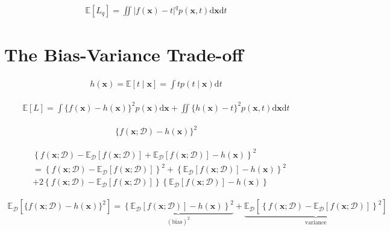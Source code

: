 \documentclass{article}
\begin{document}
\begin{align*}
\mathbb{E}\left[ L_q \right] = \iint |f(\mathbf{x}) - t|^{q} p(\mathbf{x}, t) \mathrm{d} \mathbf{x} \mathrm{d} t
\tag{4.40}
\end{align*}

\section{The Bias-Variance Trade-off}

\begin{align*}
h(\mathbf{x}) = \mathbb{E}[t \mid \mathbf{x}] = \int t p(t \mid \mathbf{x}) \mathrm{d} t
\tag{4.41}
\end{align*}

\begin{align*}
\mathbb{E}[L] = \int \{f(\mathbf{x}) - h(\mathbf{x})\}^{2} p(\mathbf{x}) \mathrm{d} \mathbf{x} + \iint \{h(\mathbf{x}) - t\}^{2} p(\mathbf{x}, t) \mathrm{d} \mathbf{x} \mathrm{d} t
\tag{4.42}
\end{align*}

\begin{align*}
\{f(\mathbf{x} ; \mathcal{D}) - h(\mathbf{x})\}^{2}
\tag{4.43}
\end{align*}

\begin{align*}
& \left\{ f(\mathbf{x} ; \mathcal{D}) - \mathbb{E}_{\mathcal{D}}[f(\mathbf{x} ; \mathcal{D})] + \mathbb{E}_{\mathcal{D}}[f(\mathbf{x} ; \mathcal{D})] - h(\mathbf{x}) \right\}^{2} \\
& = \left\{ f(\mathbf{x} ; \mathcal{D}) - \mathbb{E}_{\mathcal{D}}[f(\mathbf{x} ; \mathcal{D})] \right\}^{2} + \left\{ \mathbb{E}_{\mathcal{D}}[f(\mathbf{x} ; \mathcal{D})] - h(\mathbf{x}) \right\}^{2} \\
& + 2 \left\{ f(\mathbf{x} ; \mathcal{D}) - \mathbb{E}_{\mathcal{D}}[f(\mathbf{x} ; \mathcal{D})] \right\} \left\{ \mathbb{E}_{\mathcal{D}}[f(\mathbf{x} ; \mathcal{D})] - h(\mathbf{x}) \right\}
\tag{4.44}
\end{align*}

\begin{align*}
\mathbb{E}_{\mathcal{D}}\left[ \{f(\mathbf{x} ; \mathcal{D}) - h(\mathbf{x})\}^{2} \right]
= \underbrace{\left\{ \mathbb{E}_{\mathcal{D}}[f(\mathbf{x} ; \mathcal{D})] - h(\mathbf{x}) \right\}^{2}}_{(\text{bias})^{2}} + \underbrace{\mathbb{E}_{\mathcal{D}} \left[ \left\{ f(\mathbf{x} ; \mathcal{D}) - \mathbb{E}_{\mathcal{D}}[f(\mathbf{x} ; \mathcal{D})] \right\}^{2} \right]}_{\text{variance}}
\tag{4.45}
\end{align*}
\end{document}
